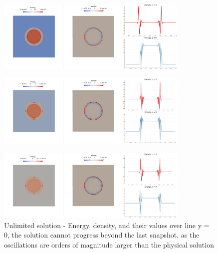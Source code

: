 	\begin{figure}[H]
		\begin{center}
			\includegraphics[width=0.82\textwidth]{img/limit/nl4.jpg}
		\end{center}
	\end{figure}\vspace{-12mm}
	\begin{figure}[H]
		\begin{center}
			\includegraphics[width=0.82\textwidth]{img/limit/nl5.jpg}
		\end{center}
	\end{figure}\vspace{-12mm}
	\begin{figure}[H]
		\begin{center}
			\includegraphics[width=0.82\textwidth]{img/limit/nl6.jpg}		
			\caption{Unlimited solution - Energy, density, and their values over line y = 0, the solution cannot progress beyond the last snapshot, as the oscillations are orders of magnitude larger than the physical solution}
		\end{center}
	\end{figure}
	
	\newpage
	
